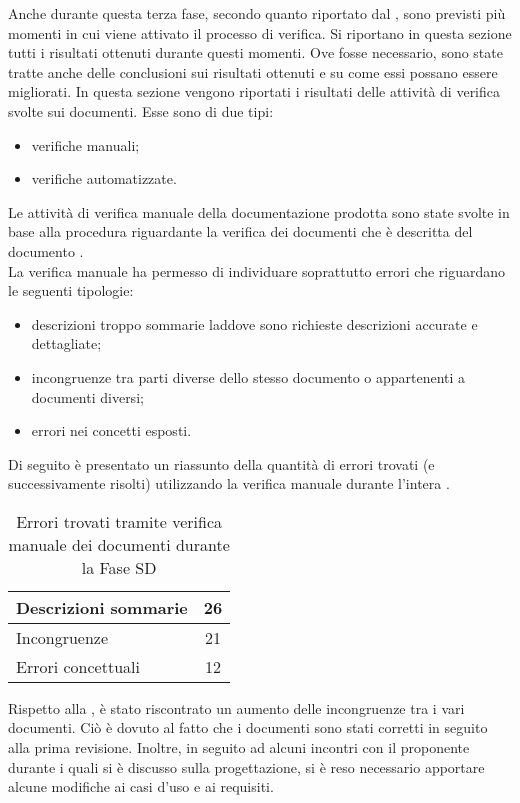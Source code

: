  \label{app:esiti}
Anche durante questa terza fase, secondo quanto riportato dal , sono previsti più momenti in cui viene attivato il processo di verifica. Si riportano in questa sezione tutti i risultati ottenuti durante questi momenti. Ove fosse necessario, sono state tratte anche delle conclusioni sui risultati ottenuti e su come essi possano essere migliorati.
			In questa sezione vengono riportati i risultati delle attività di verifica svolte sui documenti. Esse sono di due tipi:
			\begin{itemize}
				\item verifiche manuali;
				\item verifiche automatizzate.
			\end{itemize}
				Le attività di verifica manuale della documentazione prodotta sono state svolte in base alla procedura riguardante la verifica dei 
				documenti che è descritta del documento .\\
				La verifica manuale ha permesso di individuare soprattutto errori che riguardano le seguenti tipologie:
				\begin{itemize}
					\item descrizioni troppo sommarie laddove sono richieste descrizioni accurate e dettagliate;
					\item incongruenze tra parti diverse dello stesso documento o appartenenti a documenti diversi;
					\item errori nei concetti esposti.
				\end{itemize}
				Di seguito è presentato un riassunto della quantità di errori trovati (e successivamente risolti) utilizzando la verifica manuale durante l'intera .
				\begin{table}[H]
					\centering
					\begin{tabu}{| l | c |}
						\hline
						Descrizioni sommarie	&	26\\ \hline
						Incongruenze	&	21\\ \hline
						Errori concettuali	&	12\\ \hline
					\end{tabu}
					\caption{Errori trovati tramite verifica manuale dei documenti durante la Fase SD}
				\end{table}
				Rispetto alla , è stato riscontrato un aumento delle incongruenze tra i vari documenti. Ciò è dovuto al fatto che i documenti sono stati corretti in seguito alla prima revisione. Inoltre, in seguito ad alcuni incontri con il proponente durante i quali si è discusso sulla progettazione, si è reso necessario apportare alcune modifiche ai casi d'uso e ai requisiti.\\
